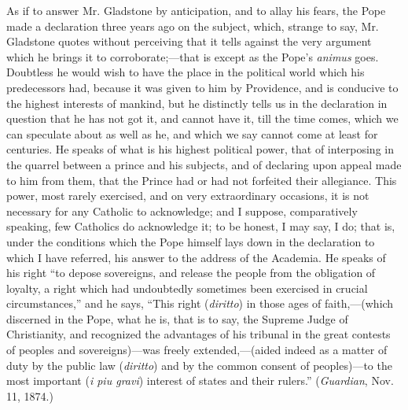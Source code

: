 As if to answer Mr. Gladstone by anticipation, and to allay his
fears, the Pope made a declaration three years ago on the subject,
which, strange to say, Mr. Gladstone quotes without perceiving that it
tells against the very argument which he brings it to corroborate;—that
is except as the Pope's \emph{animus} goes. Doubtless he would wish to
have the place in the political world which his predecessors had,
because it was given to him by Providence, and is conducive to the
highest interests of mankind, but he distinctly tells us in the
declaration in question that he has not got it, and cannot have it, till
the time comes, which we can speculate about as well as he, and which we
say cannot come at least for centuries. He speaks of what is his highest
political power, that of interposing in the quarrel between a prince and
his subjects, and of declaring upon appeal made to him from them, that
the Prince had or had not forfeited their allegiance. This power, most
rarely exercised, and on very extraordinary occasions, it is not
necessary for any Catholic to acknowledge; and I suppose, comparatively
speaking, few Catholics do acknowledge it; to be honest, I may say, I
do; that is, under the conditions which the Pope himself lays down in
the declaration to which I have referred, his answer to the address of
the Academia. He speaks of his right ``to depose sovereigns, and
release the people from the obligation of loyalty, a right which had
undoubtedly sometimes been exercised in crucial circumstances,'' and
he says, ``This right (\emph{diritto}) in those ages of faith,—(which
discerned in the Pope, what he is, that is to say, the Supreme Judge of
Christianity, and recognized the advantages of his tribunal in the great
contests of peoples and sovereigns)—was freely extended,—(aided
indeed as a matter of duty by the public law (\emph{diritto}) and by the
common consent of peoples)—to the most important (\emph{i piu gravi})
interest of states and their rulers.'' (\emph{Guardian}, Nov. 11,
1874.)

